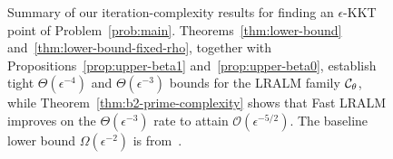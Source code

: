 \begin{figure}[t]
{%
}
\caption{Summary of our iteration-complexity results for finding an
\(\epsilon\)-KKT point of Problem~\eqref{prob:main}.
Theorems~\ref{thm:lower-bound} and~\ref{thm:lower-bound-fixed-rho}, together
with Propositions~\ref{prop:upper-beta1} and~\ref{prop:upper-beta0}, establish
tight \(\Theta(\epsilon^{-4})\) and \(\Theta(\epsilon^{-3})\) bounds for the LRALM
family \(\mathcal{C}_\theta\), while Theorem~\ref{thm:b2-prime-complexity} shows that
Fast LRALM improves on the \(\Theta(\epsilon^{-3})\) rate to attain
\(\mathcal O(\epsilon^{-5/2})\). The baseline lower bound \(\Omega(\epsilon^{-2})\)
is from~\cite{carmon2020lower}.}
\label{fig:complexity-axis}
\end{figure}

